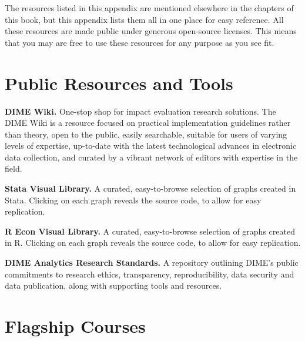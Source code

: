 
\begin{fullwidth}

The resources listed in this appendix are mentioned elsewhere in
the chapters of this book, but this appendix lists them all in one place for easy reference. All
these resources are made public under generous open-source licenses. This means
that you may are free to use these resources for any purpose as you see fit.

\end{fullwidth}


\section{Public Resources and Tools}

\textbf{DIME Wiki.}
One-stop shop for impact evaluation research solutions. The DIME Wiki is a resource focused on practical implementation guidelines rather than theory, open to the public, easily searchable, suitable for users of varying levels of expertise, up-to-date with the latest technological advances in electronic data collection, and curated by a vibrant network of editors with expertise in the field.

\textbf{Stata Visual Library.}
A curated, easy-to-browse selection of graphs created in Stata. Clicking on each graph reveals the source code, to allow for easy replication. 

\textbf{R Econ Visual Library.}
A curated, easy-to-browse selection of graphs created in R. Clicking on each graph reveals the source code, to allow for easy replication. 

\textbf{DIME Analytics Research Standards.}
A repository outlining DIME's public commitments to research ethics, transparency, reproducibility, data security and data publication, along with supporting tools and resources. 


\section{Flagship Courses}

